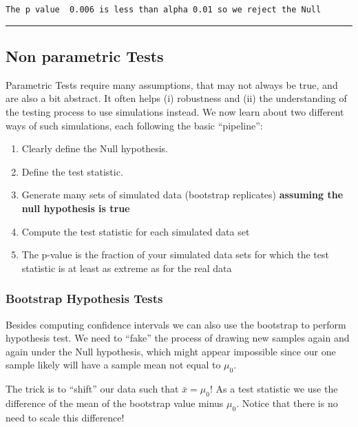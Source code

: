 \documentclass[
  letterpaper,
  DIV=11,
  numbers=noendperiod]{scrreprt}
\providecommand{\tightlist}{%
  \setlength{\itemsep}{0pt}\setlength{\parskip}{0pt}}\usepackage{longtable,booktabs,array}
\begin{document}
\begin{verbatim}
The p value  0.006 is less than alpha 0.01 so we reject the Null
\end{verbatim}

\begin{center}\rule{0.5\linewidth}{0.5pt}\end{center}

\hypertarget{non-parametric-tests}{%
\subsection{Non parametric Tests}\label{non-parametric-tests}}

Parametric Tests require many assumptions, that may not always be true,
and are also a bit abstract. It often helps (i) robustness and (ii) the
understanding of the testing process to use simulations instead. We now
learn about two different ways of such simulations, each following the
basic ``pipeline'':

\begin{enumerate}
\def\labelenumi{\arabic{enumi}.}
\tightlist
\item
  Clearly define the Null hypothesis.
\item
  Define the test statistic.
\item
  Generate many sets of simulated data (bootstrap replicates)
  \textbf{assuming the null hypothesis is true}
\item
  Compute the test statistic for each simulated data set
\item
  The p-value is the fraction of your simulated data sets for which the
  test statistic is at least as extreme as for the real data
\end{enumerate}

\hypertarget{bootstrap-hypothesis-tests}{%
\subsubsection{Bootstrap Hypothesis
Tests}\label{bootstrap-hypothesis-tests}}

Besides computing confidence intervals we can also use the bootstrap to
perform hypothesis test. We need to ``fake'' the process of drawing new
samples again and again under the Null hypothesis, which might appear
impossible since our one sample likely will have a sample mean not equal
to \(\mu_0\).

The trick is to ``shift'' our data such that \(\bar{x} = \mu_0\)! As a
test statistic we use the difference of the mean of the bootstrap value
minus \(\mu_0\). Notice that there is no need to scale this difference!
\end{document}

